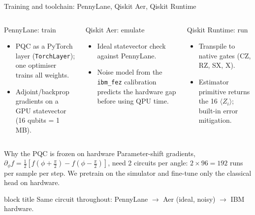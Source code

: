 \documentclass[aspectratio=169,10pt]{beamer}
\newcommand{\takeaway}[1]{%
  \vfill
  \begin{beamercolorbox}[rounded=true,shadow=false,wd=\linewidth,sep=4pt]{block title}
  \small\centering #1
  \end{beamercolorbox}}
\begin{document}
\begin{frame}{Training and toolchain: PennyLane, Qiskit Aer, Qiskit Runtime}
\begin{columns}[T,onlytextwidth]
\begin{block}{PennyLane: train}
\footnotesize
\begin{itemize}\setlength{\itemsep}{1pt}
  \item PQC as a PyTorch layer (\texttt{TorchLayer}); one optimiser trains all weights.
  \item Adjoint/backprop gradients on a GPU statevector (16 qubits = 1\,MB).
\end{itemize}
\end{block}
\begin{block}{Qiskit Aer: emulate}
\footnotesize
\begin{itemize}\setlength{\itemsep}{1pt}
  \item Ideal statevector check against PennyLane.
  \item Noise model from the \texttt{ibm\_fez} calibration predicts the hardware gap before using QPU time.
\end{itemize}
\end{block}
\begin{block}{Qiskit Runtime: run}
\footnotesize
\begin{itemize}\setlength{\itemsep}{1pt}
  \item Transpile to native gates (CZ, RZ, SX, X).
  \item Estimator primitive returns the 16 $\langle Z_i\rangle$; built-in error mitigation.
\end{itemize}
\end{block}
\end{columns}
\vspace{0.15cm}
\begin{alertblock}{Why the PQC is frozen on hardware}
\footnotesize Parameter-shift gradients, $\partial_\phi f=\tfrac12[f(\phi+\tfrac\pi2)-f(\phi-\tfrac\pi2)]$, need 2 circuits per angle: $2\times96=192$ runs per sample per step. We pretrain on the simulator and fine-tune only the classical head on hardware.
\end{alertblock}
\takeaway{Same circuit throughout: PennyLane $\to$ Aer (ideal, noisy) $\to$ IBM hardware.}
\end{frame}
\end{document}
